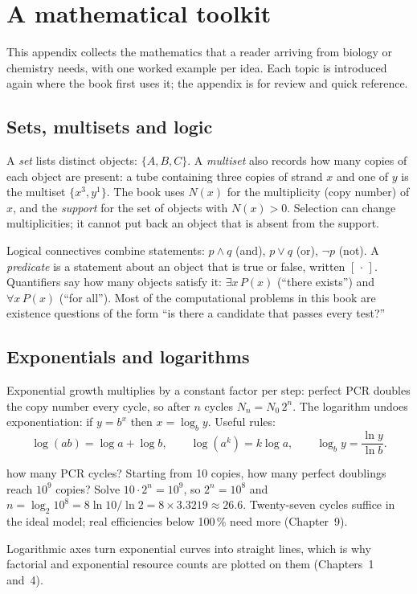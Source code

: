 \chapter{A mathematical toolkit}\label{app:math}

This appendix collects the mathematics that a reader arriving from biology or
chemistry needs, with one worked example per idea. Each topic is introduced
again where the book first uses it; the appendix is for review and quick
reference.

\section{Sets, multisets and logic}
A \emph{set} lists distinct objects: $\{A,B,C\}$. A \emph{multiset} also records
how many copies of each object are present: a tube containing three copies of
strand $x$ and one of $y$ is the multiset $\{x^3,y^1\}$. The book uses
$N(x)$ for the multiplicity (copy number) of $x$, and the \emph{support} for
the set of objects with $N(x)>0$. Selection can change multiplicities; it cannot
put back an object that is absent from the support.

Logical connectives combine statements: $p\land q$ (and), $p\lor q$ (or),
$\lnot p$ (not). A \emph{predicate} is a statement about an object that is true
or false, written $[\,\cdot\,]$. Quantifiers say how many objects satisfy it:
$\exists x\,P(x)$ (``there exists'') and $\forall x\,P(x)$ (``for all''). Most
of the computational problems in this book are existence questions of the form
``is there a candidate that passes every test?''

\section{Exponentials and logarithms}
Exponential growth multiplies by a constant factor per step: perfect PCR
doubles the copy number every cycle, so after $n$ cycles $N_n=N_0\,2^n$. The
logarithm undoes exponentiation: if $y=b^x$ then $x=\log_b y$. Useful rules:
\[
\log(ab)=\log a+\log b,\qquad \log(a^k)=k\log a,\qquad \log_b y=\frac{\ln y}{\ln b}.
\]
\begin{Worked}{how many PCR cycles?}
Starting from 10 copies, how many perfect doublings reach $10^{9}$ copies?
Solve $10\cdot2^{n}=10^{9}$, so $2^{n}=10^{8}$ and
$n=\log_2 10^8 = 8\ln10/\ln2 = 8\times3.3219\approx26.6$. Twenty-seven cycles
suffice in the ideal model; real efficiencies below 100\,\% need more
(Chapter~9).
\end{Worked}
Logarithmic axes turn exponential curves into straight lines, which is why
factorial and exponential resource counts are plotted on them (Chapters~1
and~4).

